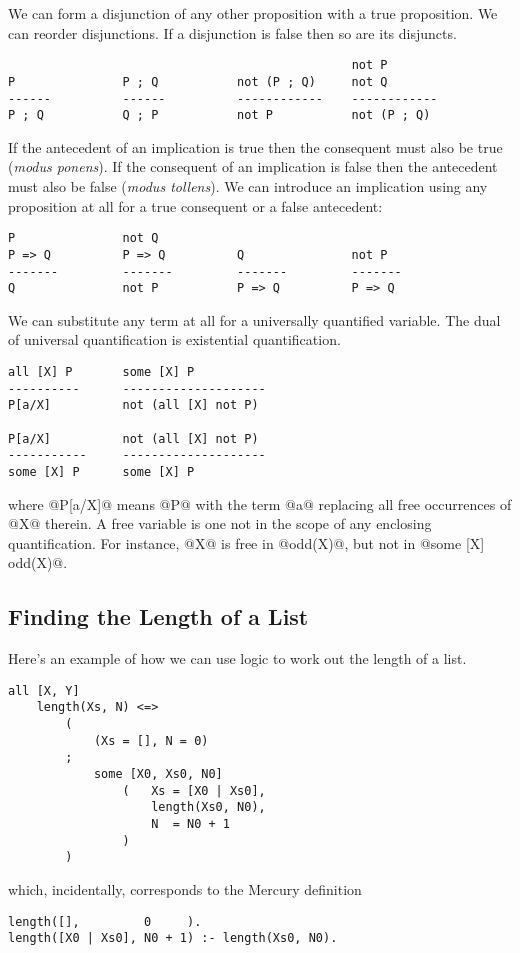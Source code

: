 We can form a disjunction of any other proposition with a true
proposition.
We can reorder disjunctions.
If a disjunction is false then so are its disjuncts.
\begin{verbatim}
                                                not P
P               P ; Q           not (P ; Q)     not Q
------          ------          ------------    ------------
P ; Q           Q ; P           not P           not (P ; Q)
\end{verbatim}

If the antecedent of an implication is true then the consequent must
also be true (\emph{modus ponens}).
If the consequent of an implication is false then the antecedent must
also be false (\emph{modus tollens}).
We can introduce an implication using any proposition at all for a true
consequent or a false antecedent:
\begin{verbatim}
P               not Q
P => Q          P => Q          Q               not P
-------         -------         -------         -------
Q               not P           P => Q          P => Q
\end{verbatim}

We can substitute any term at all for a universally quantified
variable.
The dual of universal quantification is existential quantification.
\begin{verbatim}
all [X] P       some [X] P
----------      --------------------
P[a/X]          not (all [X] not P)

P[a/X]          not (all [X] not P)
-----------     --------------------
some [X] P      some [X] P
\end{verbatim}
where @P[a/X]@ means @P@ with the term @a@ replacing all free
occurrences of @X@ therein.  A free variable is one not in the scope of
any enclosing quantification.  For instance, @X@ is free in @odd(X)@,
but not in @some [X] odd(X)@.


\subsection{Finding the Length of a List}

Here's an example of how we can use logic to work out the length of a
list.
\begin{verbatim}
all [X, Y]
    length(Xs, N) <=>
        (
            (Xs = [], N = 0)
        ;
            some [X0, Xs0, N0]
                (   Xs = [X0 | Xs0],
                    length(Xs0, N0),
                    N  = N0 + 1
                )
        )
\end{verbatim}
which, incidentally, corresponds to the Mercury definition
\begin{verbatim}
length([],         0     ).
length([X0 | Xs0], N0 + 1) :- length(Xs0, N0).
\end{verbatim}


